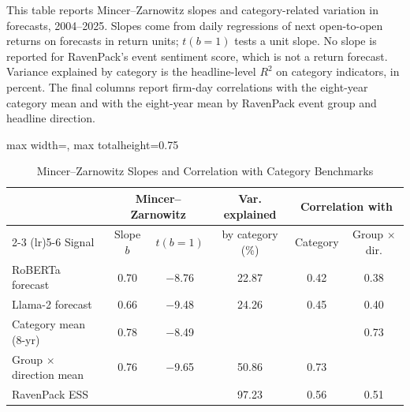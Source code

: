 \begin{table}[htbp]
\centering
\caption{Mincer--Zarnowitz Slopes and Correlation with Category Benchmarks}
\label{tab:tabA_mz}
\begin{minipage}{\linewidth}\footnotesize
This table reports Mincer--Zarnowitz slopes and category-related variation in forecasts, 2004--2025. Slopes come from daily regressions of next open-to-open returns on forecasts in return units; $t(b=1)$ tests a unit slope. No slope is reported for RavenPack's event sentiment score, which is not a return forecast. Variance explained by category is the headline-level $R^2$ on category indicators, in percent. The final columns report firm-day correlations with the eight-year category mean and with the eight-year mean by RavenPack event group and headline direction.
\end{minipage}
\medskip

{\footnotesize
\begin{adjustbox}{max width=\linewidth, max totalheight=0.75\textheight}
\begin{tabular}{lccccc}
\toprule
 & \multicolumn{2}{c}{Mincer--Zarnowitz} & Var. explained & \multicolumn{2}{c}{Correlation with} \\
\cmidrule(lr){2-3} \cmidrule(lr){5-6}
Signal & Slope $b$ & $t(b=1)$ & by category (\%) & Category & Group $\times$ dir. \\
\midrule
RoBERTa forecast & 0.70 & $-$8.76 & 22.87 & 0.42 & 0.38 \\
Llama-2 forecast & 0.66 & $-$9.48 & 24.26 & 0.45 & 0.40 \\
Category mean (8-yr) & 0.78 & $-$8.49 &  &  & 0.73 \\
Group $\times$ direction mean & 0.76 & $-$9.65 & 50.86 & 0.73 &  \\
RavenPack ESS &  &  & 97.23 & 0.56 & 0.51 \\
\bottomrule
\end{tabular}
\end{adjustbox}
}
\end{table}
